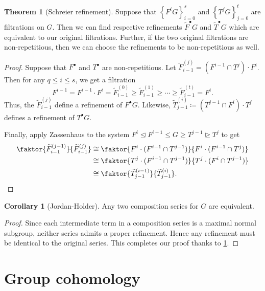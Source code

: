 \documentclass[10pt,letterpaper,cm]{nupset}
\theoremstyle{definition}
\theoremstyle{theorem}
\newtheorem{theorem}[definition]{Theorem}
\newtheorem{corollary}[definition]{Corollary}
\theoremstyle{remark}
\newcommand{\1}{\mathbf{1}}
\newcommand{\0}{\vec 0}
\begin{document}
\begin{theorem}[Schreier refinement]\label{schr}
Suppose that $\left\{F^iG\right\}_{i=0}^s$ and $\left\{T^jG\right\}_{j=0}^t$ are filtrations on $G$. Then we can find respective refinements $\widetilde{F}^{\bullet}G$ and $\widetilde{T}^{\bullet}G$ which are equivalent to our original filtrations. Further, if the two original filtrations are non-repetitious, then we can choose the refinements to be non-repetitious as well. 
\end{theorem}
\begin{proof}
Suppose that $F^{\bullet}$ and $T^{\bullet}$ are non-repetitious. Let $\widetilde{F}_{i-1}^{(j)} =  \left(F^{i-1}\cap T^j\right) \cdot F^i$. Then for any $q\leq i \leq s$, we get a filtration $$F^{i-1} = F^{i-1}\cdot F^i =\widetilde{F}_{i-1}^{(0)}\geq \widetilde{F}_{i-1}^{(1)}\geq \cdots \geq \widetilde{F}_{i-1}^{(t)} = F^i.$$ Thus, the $\widetilde{F}_{i-1}^{(j)}$ define a refinement of $F^{\bullet}G$. 
Likewise, $\widetilde{T}_{j-1}^{(i)} \coloneqq  (T^{j-1}\cap F^i) \cdot T^j$ defines a refinement of $T^{\bullet}G$.

\medskip

 Finally, apply Zassenhaus to the system $F^i \unlhd F^{i-1} \leq G \geq T^{j-1} \unrhd T^j$ to get
\begin{align*}
\faktor{\widetilde{F}_{i-1}^{(j-1)}}{\widetilde{F}_{i-1}^{(j)}} & \cong \faktor{F^i\cdot (F^{i-1} \cap T^{j-1})}{F^i \cdot (F^{i-1} \cap T^j)}
\\ &  \cong \faktor{T^j \cdot (F^{i-1} \cap T^{j-1})}{T^j\cdot (F^i \cap T^{j-1})}
\\ &  \cong   \faktor{\widetilde{T}_{j-1}^{(i-1)}}{\widetilde{T}_{j-1}^{(i)}} .
\end{align*}
\end{proof}

\begin{corollary}[Jordan-Holder]
Any two composition series for $G$ are equivalent.
\end{corollary}
\begin{proof}
Since each intermediate term in a composition series is a maximal normal subgroup, neither series admits a proper refinement. Hence any refinement must be identical to the original series. This completes our proof thanks to \cref{schr}.
\end{proof}

\section{Group cohomology}
\end{document}

